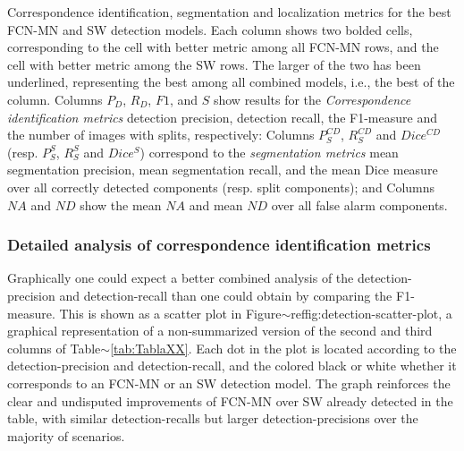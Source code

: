 \documentclass[a4paper,authoryear,review]{elsarticle}
\begin{document}
\begin{table}[]
    \caption{Correspondence identification, segmentation and localization metrics for the best FCN-MN and SW detection models.   Each column shows two bolded cells, corresponding to the cell with better metric among all FCN-MN rows, and the cell with better metric among the SW rows. The larger of the two has been underlined, representing the best among all combined models, i.e., the best of the column.  Columns $P_D$, $R_D$, $F1$, and $S$ show results for the \emph{Correspondence identification metrics} detection precision, detection recall, the F1-measure and the number of images with splits, respectively: Columns $P_S^{CD}$, $R_S^{CD}$ and $Dice^{CD}$ (resp. $P_S^S$, $R_S^S$ and $Dice^S$) correspond to the \emph{segmentation metrics} mean segmentation precision, mean segmentation recall, and the mean Dice measure over all correctly detected components (resp. split components); and Columns $NA$ and $ND$ show the mean $NA$ and mean $ND$ over all false alarm components.}
        \label{tab:TablaXX}
    \end{table}

\subsubsection{Detailed analysis of correspondence identification metrics} 
\label{sub:compFCNSW}


Graphically one could expect a better combined analysis of the detection-precision and detection-recall than one could obtain by comparing the F1-measure. This is shown as a scatter plot in Figure$\sim$ref{fig:detection-scatter-plot}, a graphical representation of a non-summarized version of the second and third columns of Table$\sim$\ref{tab:TablaXX}. Each dot  in the plot is located according to the detection-precision and detection-recall, and the colored black or white whether it corresponds to an FCN-MN or an SW detection model.
%
The graph reinforces the clear and undisputed improvements of FCN-MN over SW already detected in the table, with similar detection-recalls but larger detection-precisions over the majority of scenarios. 
\end{document}
